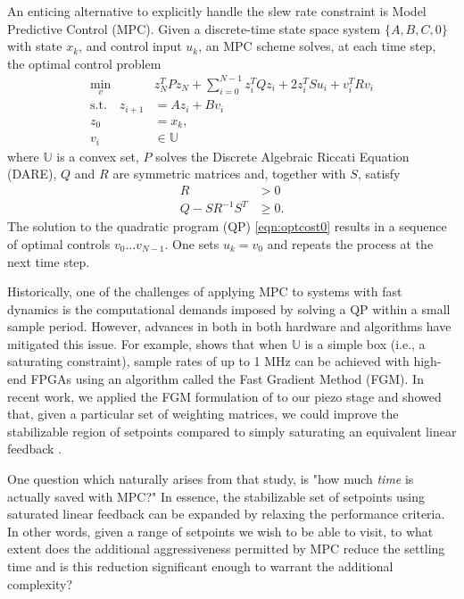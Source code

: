 \documentclass[twocolumn,twoside]{IEEEtran}
\begin{document}
An enticing alternative to explicitly handle the slew rate constraint is Model Predictive Control (MPC).
Given a discrete-time state space system $\{A,B,C,0\}$ with state $x_k$, and control input $u_k$, an MPC scheme solves, at each time step, the optimal control problem 
\begin{subequations}
\begin{align}
\min_{v}\:\:& z^T_{N}Pz_{N} + \sum_{i=0}^{N-1}z_{i}^{T}Qz_{i} + 2z^T_iSu_i + v^{T}_{i}Rv_{i} \\
 \text{s.t.} \quad z_{i+1} &= A z_{i} + B v_{i}\\
z_{0} &= x_{k}, \\
v_i  &\in \mathds{U}
\end{align}\label{eqn:optcost0}%
\end{subequations}
where $\mathds{U}$ is a convex set, $P$ solves the Discrete Algebraic Riccati Equation (DARE), $Q$ and $R$ are symmetric matrices and, together with $S$, satisfy
\begin{align}
  R &> 0 \label{eqn:schur0}\\
  Q - SR^{-1}S^T &\geq 0. \label{eqn:schur1}
\end{align}
The solution to the quadratic program (QP) \eqref{eqn:optcost0} results in a sequence of optimal controls $v_0\dots v_{N-1}$. One sets $u_k = v_0$ and repeats the process at the next time step.

Historically, one of the challenges of applying MPC to systems with fast dynamics is the computational demands imposed by solving a QP within a small sample period. However, advances in both in both hardware and algorithms have mitigated this issue. For example, \cite{Jerez_Trans_2014} shows that when $\mathds{U}$ is a simple box (i.e., a saturating constraint), sample rates of up to 1 MHz can be achieved with high-end FPGAs using an algorithm called the Fast Gradient Method (FGM). In recent work, we applied the FGM formulation of \cite{Jerez_Trans_2014} to our piezo stage and showed that, given a particular set of weighting matrices, we could improve the stabilizable region of setpoints compared to simply saturating an equivalent linear feedback \cite{braker_application_2017}.

One question which naturally arises from that study, is "how much \emph{time} is actually saved with MPC?" In essence, the stabilizable set of setpoints using saturated linear feedback can be expanded by relaxing the performance criteria.
In other words, given a range of setpoints we wish to be able to visit, to what extent does the additional aggressiveness permitted by MPC reduce the settling time and is this reduction significant enough to warrant the additional complexity?
\end{document}
